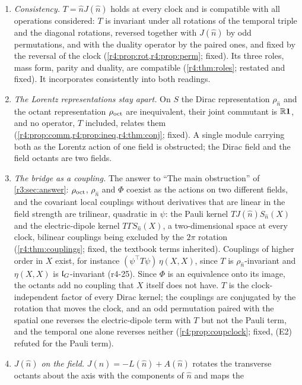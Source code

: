 \begin{enumerate}[label=(\arabic*),leftmargin=2.2em]
\item \emph{Consistency.} $T=\hat nJ(\hat n)$ holds at every clock and is compatible with all operations considered: $T$ is invariant under all rotations of the
temporal triple and the diagonal rotations, reversed together with $J(\hat n)$ by odd permutations, and with the duality operator by the paired ones,
and fixed by the
reversal of the clock (\cref{r4:prop:rot,r4:prop:perm}; fixed). Its three roles, mass form, parity and duality, are compatible (\cref{r4:thm:roles};
restated and fixed). It incorporates consistently into both readings.
\item \emph{The Lorentz representations stay apart.} On $S$ the Dirac representation $\rho_{\hat n}$ and the octant representation $\rho_{\rm oct}$ are inequivalent,
their joint commutant is $\mathbb{R}\mathbf 1$, and no operator, $T$ included, relates them (\cref{r4:prop:comm,r4:prop:ineq,r4:thm:conj}; fixed). A single module
carrying both as the Lorentz action of one field is obstructed; the Dirac field and the field octants are two fields.
\item \emph{The bridge as a coupling.} The answer to ``The main obstruction'' of \cref{r3:sec:answer}: $\rho_{\rm oct}$, $\rho_{\hat n}$ and $\Phi$ coexist as the
actions on two different fields, and the covariant local couplings without derivatives that are linear in the field strength are trilinear,
quadratic in $\psi$: the Pauli kernel $TJ(\hat n)S_{\hat n}(X)$ and the electric-dipole kernel $T\Gamma S_{\hat n}(X)$, a two-dimensional space at every clock,
bilinear couplings being excluded by the $2\pi$ rotation (\cref{r4:thm:couplings}; fixed, the textbook terms inherited). Couplings of higher
order in $X$ exist, for instance $(\psi^{\!\top}T\psi)\,\eta(X,X)$, since $T$ is $\rho_{\hat n}$-invariant and $\eta(X,X)$ is $\mathfrak l_G$-invariant (r4-25). Since $\Phi$ is an equivalence onto its image, the octants add no coupling that $X$ itself
does not have. $T$ is the clock-independent factor of every Dirac kernel; the couplings are conjugated by the rotation that moves the clock, and an odd
permutation paired with the spatial one reverses the electric-dipole term with $T$ but not the Pauli term, and the temporal one alone reverses
neither (\cref{r4:prop:coupclock}; fixed, (E2) refuted for the Pauli term).
\item \emph{$J(\hat n)$ on the field.} $J(\hat n)=-L(\hat n)+A(\hat n)$ rotates the transverse octants about the axis with the components of $\hat n$ and maps the

\end{enumerate}
